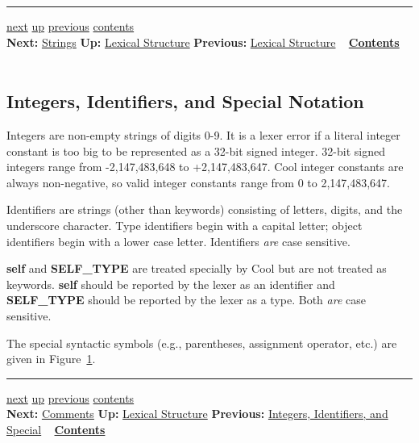 \documentclass[]{article}
\begin{document}
\begin{center}\rule{3in}{0.4pt}\end{center}

\href{node35.html}{next} \href{node33.html}{up}
\href{node33.html}{previous} \href{node1.html}{contents} \\
\textbf{Next:} \href{node35.html}{Strings} \textbf{Up:}
\href{node33.html}{Lexical Structure} \textbf{Previous:}
\href{node33.html}{Lexical Structure} ~
\textbf{\href{node1.html}{Contents}} \\ \\

\subsection{Integers, Identifiers, and Special Notation}

Integers are non-empty strings of digits 0-9. It is a lexer error if a
literal integer constant is too big to be represented as a 32-bit signed
integer. 32-bit signed integers range from -2,147,483,648 to
+2,147,483,647. Cool integer constants are always non-negative, so valid
integer constants range from 0 to 2,147,483,647.

Identifiers are strings (other than keywords) consisting of letters,
digits, and the underscore character. Type identifiers begin with a
capital letter; object identifiers begin with a lower case letter.
Identifiers \emph{are} case sensitive.

\textbf{self} and \textbf{SELF\_TYPE} are treated specially by Cool but
are not treated as keywords. \textbf{self} should be reported by the
lexer as an identifier and \textbf{SELF\_TYPE} should be reported by the
lexer as a type. Both \emph{are} case sensitive.

The special syntactic symbols (e.g., parentheses, assignment operator,
etc.) are given in Figure~\href{node39.html\#fig1}{1}.

\begin{center}\rule{3in}{0.4pt}\end{center}

\href{node36.html}{next} \href{node33.html}{up}
\href{node34.html}{previous} \href{node1.html}{contents} \\
\textbf{Next:} \href{node36.html}{Comments} \textbf{Up:}
\href{node33.html}{Lexical Structure} \textbf{Previous:}
\href{node34.html}{Integers, Identifiers, and Special} ~
\textbf{\href{node1.html}{Contents}} \\ \\
\end{document}
